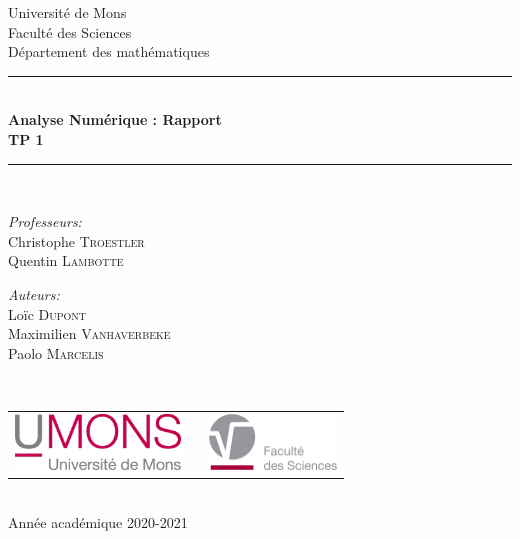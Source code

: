 \documentclass[a4paper, 12pt]{article}
\begin{document}
\begin{titlepage}
\begin{center}

{\Large Université de Mons}\\[1ex]
{\Large Faculté des Sciences}\\[1ex]
{\Large Département des mathématiques}\\[2.5cm]

\newcommand{\HRule}{\rule{\linewidth}{0.3mm}}
\HRule \\[0.3cm]
{ \LARGE \bfseries Analyse Numérique : Rapport \\[0.3cm]}
{ \LARGE \bfseries TP 1 \\[0.1cm]}
\HRule \\[1.5cm]

\begin{minipage}[t]{0.45\textwidth}
\begin{flushleft} \large
\emph{Professeurs:}\\
Christophe \textsc{Troestler} \\
Quentin \textsc{Lambotte}
\end{flushleft}
\end{minipage}
\begin{minipage}[t]{0.45\textwidth}
\begin{flushright} \large
\emph{Auteurs:} \\
Loïc \textsc{Dupont} \\
Maximilien \textsc{Vanhaverbeke} \\
Paolo \textsc{Marcelis}
\end{flushright}
\end{minipage}\\[2ex]

\vfill

\begin{center}
\begin{tabular}[t]{c c c}
\includegraphics[height=1.5cm]{logoumons.jpg} &
\hspace{0.3cm} &
\includegraphics[height=1.5cm]{logofs.jpg}
\end{tabular}
\end{center}~\\
 
{\large Année académique 2020-2021}

\end{center}
\end{titlepage}
\end{document}
